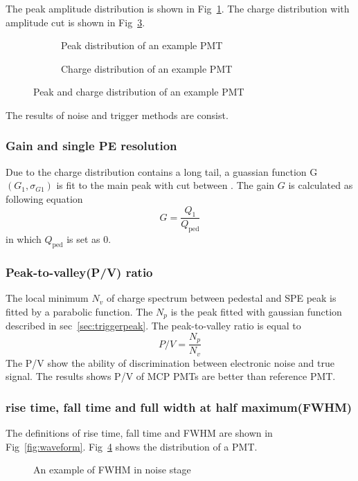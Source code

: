 The peak amplitude distribution is shown in Fig~\ref{fig:triggerpeak}. The charge distribution with amplitude cut is shown in Fig~\ref{fig:triggercharge}.
\begin{figure}[!htbp]
    \centering
    \begin{subfigure}[b]{0.35\textwidth}
        \caption{Peak distribution of an example PMT}%
        \label{fig:triggerpeak}
    \end{subfigure}
    \begin{subfigure}[b]{0.35\textwidth}
        \caption{Charge distribution of an example PMT}%
        \label{fig:triggercharge}
    \end{subfigure}
    \caption{Peak and charge distribution of an example PMT}
\end{figure}
The results of noise and trigger methods are consist.
\subsubsection{Gain and single PE resolution}
Due to the charge distribution contains a long tail, a guassian function G$(G_1,\sigma_{G1})$ is fit to the main peak with cut between . The gain $G$ is calculated as following equation
\begin{equation}
    G=\frac{Q_1}{Q_{\mathrm{ped}}}
\end{equation}
in which $Q_{\mathrm{ped}}$ is set as 0.
\subsubsection{Peak-to-valley(P/V) ratio}
The local minimum $N_v$ of charge spectrum between pedestal and SPE peak is fitted by a parabolic function. The $N_p$ is the peak fitted with gaussian function described in sec~\ref{sec:triggerpeak}.
The peak-to-valley ratio is equal to  
\begin{equation}
    P/V=\frac{N_p}{N_v}
\end{equation}
The P/V show the ability of discrimination between electronic noise and true signal. The results shows P/V of MCP PMTs are better than reference PMT.
\subsubsection{rise time, fall time and full width at half maximum(FWHM)}
The definitions of rise time, fall time and FWHM are shown in Fig~\ref{fig:waveform}. Fig~\ref{fig:FWHM} shows the distribution of a PMT.
\begin{figure}
    \caption{An example of FWHM in noise stage}
    \label{fig:FWHM}
\end{figure}
